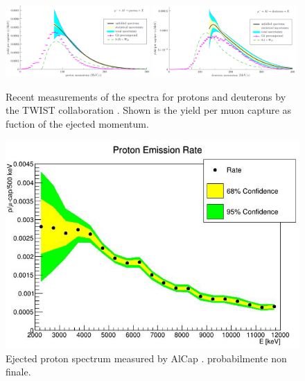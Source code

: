 \documentclass[12pt,a4paper,openright, oneside, titlepage]{book} %
\begin{document}
\begin{figure}[h!]
\centering
\includegraphics[width=0.49\textwidth]{new_spectra_2/Gaponenko_protons}\hfill
\includegraphics[width=0.49\textwidth]{new_spectra_2/Gaponenko_deuterons}
\caption{Recent measurements of the spectra for protons and deuterons by the TWIST collaboration \cite{TWIST:2020}. Shown is the yield per muon capture as fuction of the ejected momentum.}
\label{_TWIST}
\end{figure}

\begin{figure}[h!]
\centering
\includegraphics[scale=0.6]{new_spectra_2/Quirk_protons}
\caption{Ejected proton spectrum measured by AlCap \cite{AlCap:2020}. probabilmente non finale.}
\label{_AlCap}
\end{figure}
\end{document}
